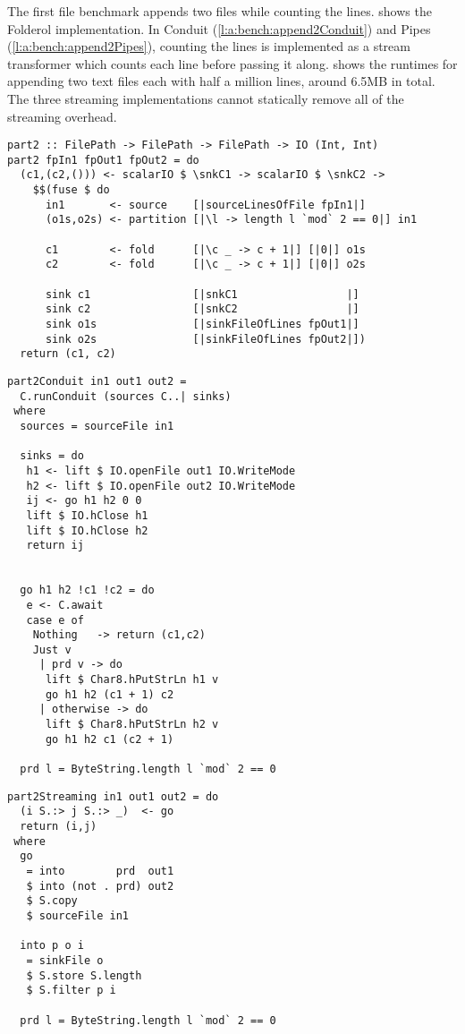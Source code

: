 The first file benchmark appends two files while counting the lines.
 shows the Folderol implementation.
In Conduit (\cref{l:a:bench:append2Conduit}) and Pipes (\cref{l:a:bench:append2Pipes}), counting the lines is implemented as a stream transformer which counts each line before passing it along.
 shows the runtimes for appending two text files each with half a million lines, around 6.5MB in total.
The three streaming implementations cannot statically remove all of the streaming overhead.



\begin{lstlisting}[float,label=l:bench:part2Folderol,caption=Folderol implementation of \Hs/part2/]
part2 :: FilePath -> FilePath -> FilePath -> IO (Int, Int)
part2 fpIn1 fpOut1 fpOut2 = do
  (c1,(c2,())) <- scalarIO $ \snkC1 -> scalarIO $ \snkC2 ->
    $$(fuse $ do
      in1       <- source    [|sourceLinesOfFile fpIn1|]
      (o1s,o2s) <- partition [|\l -> length l `mod` 2 == 0|] in1

      c1        <- fold      [|\c _ -> c + 1|] [|0|] o1s
      c2        <- fold      [|\c _ -> c + 1|] [|0|] o2s

      sink c1                [|snkC1                 |]
      sink c2                [|snkC2                 |]
      sink o1s               [|sinkFileOfLines fpOut1|]
      sink o2s               [|sinkFileOfLines fpOut2|])
  return (c1, c2)
\end{lstlisting}

\begin{lstlisting}[float,label=l:a:bench:part2Conduit,caption=Conduit implementation of \Hs/part2/]
part2Conduit in1 out1 out2 =
  C.runConduit (sources C..| sinks)
 where
  sources = sourceFile in1

  sinks = do
   h1 <- lift $ IO.openFile out1 IO.WriteMode
   h2 <- lift $ IO.openFile out2 IO.WriteMode
   ij <- go h1 h2 0 0
   lift $ IO.hClose h1
   lift $ IO.hClose h2
   return ij


  go h1 h2 !c1 !c2 = do
   e <- C.await
   case e of
    Nothing   -> return (c1,c2)
    Just v
     | prd v -> do
      lift $ Char8.hPutStrLn h1 v
      go h1 h2 (c1 + 1) c2
     | otherwise -> do
      lift $ Char8.hPutStrLn h2 v
      go h1 h2 c1 (c2 + 1)

  prd l = ByteString.length l `mod` 2 == 0
\end{lstlisting}

\begin{lstlisting}[float,label=l:a:bench:part2Streaming,caption=Streaming implementation of \Hs/part2/]
part2Streaming in1 out1 out2 = do
  (i S.:> j S.:> _)  <- go
  return (i,j)
 where
  go
   = into        prd  out1
   $ into (not . prd) out2
   $ S.copy
   $ sourceFile in1

  into p o i
   = sinkFile o
   $ S.store S.length
   $ S.filter p i

  prd l = ByteString.length l `mod` 2 == 0
\end{lstlisting}


